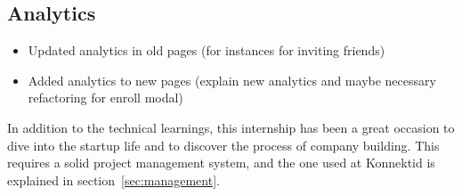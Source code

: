 \subsection{Analytics}
\label{ssec:analytics}

\begin{itemize}
    \item Updated analytics in old pages (for instances for inviting friends)
    \item Added analytics to new pages (explain new analytics and maybe necessary refactoring for enroll modal)
\end{itemize}

In addition to the technical learnings, this internship has been a great occasion to dive into the startup life and to discover the process of company building. This requires a solid project management system, and the one used at Konnektid is explained in {\sc section}~\ref{sec:management}.